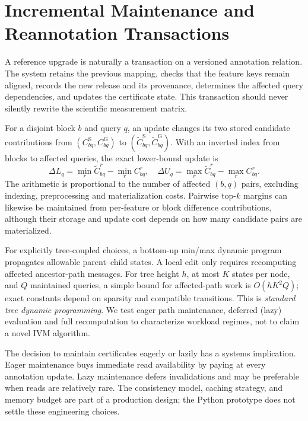 \documentclass[conference]{IEEEtran}
\newcommand{\Sref}{\mathrm{S}}
\newcommand{\Gref}{\mathrm{G}}
\begin{document}
\section{Incremental Maintenance and Reannotation Transactions}
\label{sec:updates}
A reference upgrade is naturally a transaction on a versioned annotation relation. The system retains the previous mapping, checks that the feature keys remain aligned, records the new release and its provenance, determines the affected query dependencies, and updates the certificate state. This transaction should never silently rewrite the scientific measurement matrix.

For a disjoint block $b$ and query $q$, an update changes its two stored candidate contributions from $(C_{bq}^{\Sref},C_{bq}^{\Gref})$ to $(\widetilde C_{bq}^{\Sref},\widetilde C_{bq}^{\Gref})$. With an inverted index from blocks to affected queries, the exact lower-bound update is
\begin{equation}
\Delta L_q=\min_r\widetilde C_{bq}^{r}-\min_r C_{bq}^{r},
\quad \Delta U_q=\max_r\widetilde C_{bq}^{r}-\max_r C_{bq}^{r}.
\label{eq:delta}
\end{equation}
The arithmetic is proportional to the number of affected $(b,q)$ pairs, excluding indexing, preprocessing and materialization costs. Pairwise top-$k$ margins can likewise be maintained from per-feature or block difference contributions, although their storage and update cost depends on how many candidate pairs are materialized.

For explicitly tree-coupled choices, a bottom-up min/max dynamic program propagates allowable parent--child states. A local edit only requires recomputing affected ancestor-path messages. For tree height $h$, at most $K$ states per node, and $Q$ maintained queries, a simple bound for affected-path work is $O(hK^2Q)$; exact constants depend on sparsity and compatible transitions. This is \emph{standard tree dynamic programming}. We test eager path maintenance, deferred (lazy) evaluation and full recomputation to characterize workload regimes, not to claim a novel IVM algorithm.

The decision to maintain certificates eagerly or lazily has a systems implication. Eager maintenance buys immediate read availability by paying at every annotation update. Lazy maintenance defers invalidations and may be preferable when reads are relatively rare. The consistency model, caching strategy, and memory budget are part of a production design; the Python prototype does not settle these engineering choices.
\end{document}
